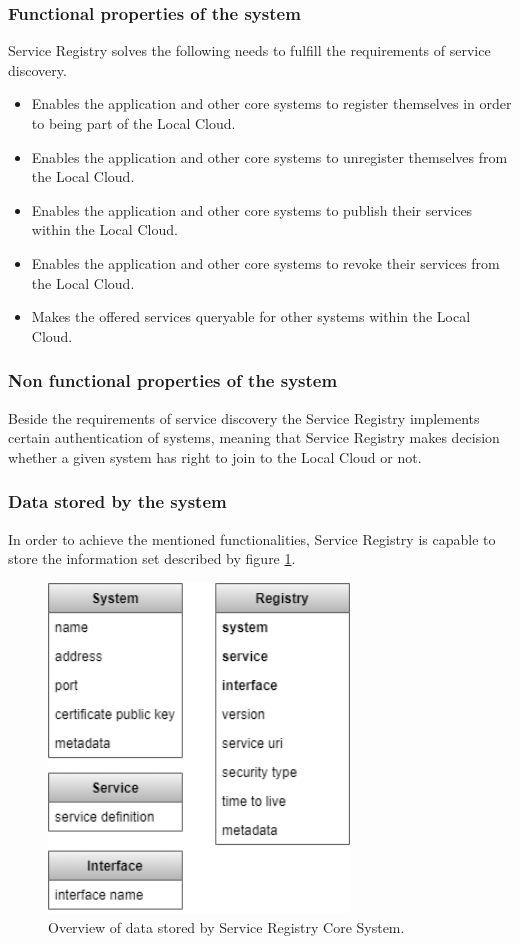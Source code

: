 \documentclass[a4paper]{arrowhead}
\begin{document}
\subsubsection {Functional properties of the system}
Service Registry solves the following needs to fulfill the requirements of service discovery.

\begin{itemize}
    \item Enables the application and other core systems to register themselves in order to being part of the Local Cloud.
    \item Enables the application and other core systems to unregister themselves from the Local Cloud.
    \item Enables the application and other core systems to publish their services within the Local Cloud.
    \item Enables the application and other core systems to revoke their services from the Local Cloud.
    \item Makes the offered services queryable for other systems within the Local Cloud.
\end{itemize}

\subsubsection {Non functional properties of the system}
Beside the requirements of service discovery the Service Registry implements certain authentication of systems, meaning that Service Registry makes decision whether a given system has right to join to the Local Cloud or not.

\subsubsection {Data stored by the system}
In order to achieve the mentioned functionalities, Service Registry is capable to store the information set described by figure \ref{fig:information_overview}.

\begin{figure}[h!]
  \centering
  \includegraphics[width=8cm]{figures/serviceregistry_data_overview.png}
  \caption{
    Overview of data stored by Service Registry Core System.
  }
  \label{fig:information_overview}
\end{figure}
\end{document}

